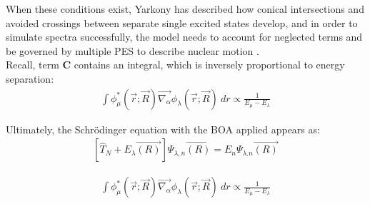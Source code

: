 \documentclass[letterpaper, 12pt, oneside]{report}
\begin{document}
When these conditions exist, Yarkony has described how conical intersections and avoided crossings between separate single excited states develop, and in order to simulate spectra successfully, the model needs to account for neglected terms and be governed by multiple PES to describe nuclear motion \cite{yarkony2001conical}. %
\\ 
Recall, term \textbf{C} contains an integral, which is inversely proportional to energy separation:
\begin{equation}\label{eq:inverseproportional}
    \begin{split}
            \int \phi_{\mu}^{*} (\Vec{r};\Vec{R}) \Vec{\nabla_{\alpha}} \phi_{\lambda} (\Vec{r};\Vec{R})~dr 
            \propto \frac{1}{E_{\mu} - E_{\lambda}}
    \end{split}
\end{equation}

Ultimately, the Schrödinger equation with the BOA applied appears as:
\begin{equation}\label{eq:10}
    \begin{split} 
            \left[ \hat{T}_N + E_{\lambda} \Vec{(R)} \right] \Psi_{\lambda, n} \Vec{(R)} = E_{n} \Psi_{\lambda. n} \Vec{(R)}
    \end{split}
\end{equation}

\begin{equation}\label{eq:inverseproportional}
    \begin{split}
            \int \phi_{\mu}^{*} (\Vec{r};\Vec{R}) \Vec{\nabla_{\alpha}} \phi_{\lambda} (\Vec{r};\Vec{R})~dr 
            \propto \frac{1}{E_{\mu} - E_{\lambda}}
    \end{split}
\end{equation}
\end{document}
